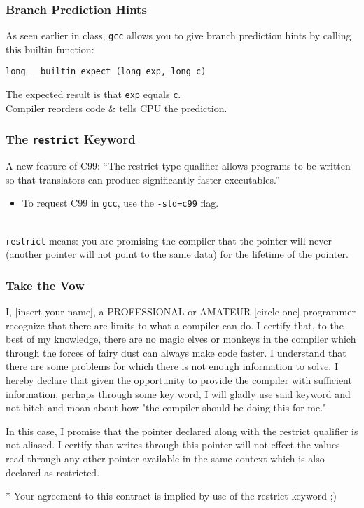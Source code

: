 \begin{frame}[fragile]
  \frametitle{Branch Prediction Hints}

  
  As seen earlier in class, {\tt gcc} allows you to give branch
  prediction hints by calling this builtin function:

  \begin{center}
    \verb+long __builtin_expect (long exp, long c)+
  \end{center}

  The expected result is that {\tt exp} equals {\tt c}.\\[1em]
  Compiler reorders code \& tells CPU the prediction.
  
  
\end{frame}

\begin{frame}
  \frametitle{The {\tt restrict} Keyword}

   
   A new feature of C99: ``The restrict type qualifier allows programs to
      be written so that translators can produce significantly faster
      executables.''
  \begin{itemize}
    \item To request C99 in {\tt gcc}, use the {\tt -std=c99} flag.
  \end{itemize}
~\\
   {\tt restrict} means: you are promising the
      compiler that the pointer will never  (another pointer
      will not point to the same data) for the lifetime of the pointer.
  

\end{frame}

\begin{frame}
\frametitle{Take the Vow}


I, [insert your name], a PROFESSIONAL or AMATEUR [circle one] programmer recognize that there are limits to what a compiler can do. I certify that, to the best of my knowledge, there are no magic elves or monkeys in the compiler which through the forces of fairy dust can always make code faster. I understand that there are some problems for which there is not enough information to solve. I hereby declare that given the opportunity to provide the compiler with sufficient information, perhaps through some key word, I will gladly use said keyword and not bitch and moan about how "the compiler should be doing this for me."

In this case, I promise that the pointer declared along with the restrict qualifier is not aliased. I certify that writes through this pointer will not effect the values read through any other pointer available in the same context which is also declared as restricted.

* Your agreement to this contract is implied by use of the restrict keyword ;)



\end{frame}

